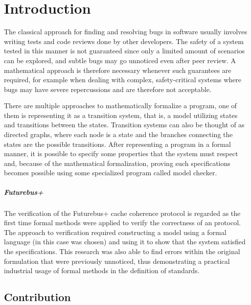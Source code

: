 \chapter{Introduction}
\label{introduction}

The classical approach for finding and resolving bugs in software usually involves writing tests and code reviews done by other developers.
The safety of a system tested in this manner is not guaranteed since only a limited amount of scenarios can be explored, and subtle bugs may go unnoticed even after peer review.
A mathematical approach is therefore necessary whenever such guarantees are required, for example when dealing with complex, safety-critical systems where bugs may have severe repercussions and are therefore not acceptable.

There are multiple approaches to mathematically formalize a program, one of them is representing it as a transition system, that is, a model utilizing states and transitions between the states.
Transition systems can also be thought of as directed graphs, where each node is a state and the branches connecting the states are the possible transitions.
After representing a program in a formal manner, it is possible to specify some properties that the system must respect and, because of the mathematical formalization, proving such specifications becomes possible using some specialized program called model checker.

\paragraph*{Futurebus+}
The verification of the \ieee{} Futurebus+ cache coherence protocol \cite{DBLP:journals/fmsd/ClarkeGHJLMN95} is regarded as the first time formal methods were applied to verify the correctness of an \ieee{} protocol.
The approach to verification required constructing a model using a formal language (in this case \smv{} was chosen) and using it to show that the system satisfied the specifications.
This research was also able to find errors within the original formulation that were previously unnoticed, thus demonstrating a practical industrial usage of formal methods in the definition of standards.

\section{Contribution}

